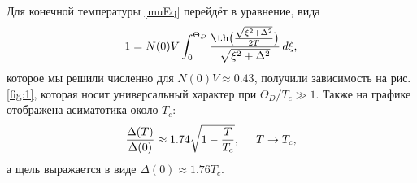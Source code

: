 Для конечной температуры \eqref{muEq} перейдёт в уравнение, вида
\begin{equation*}
	1 = N(0) V \int_{0}^{\Theta_D} \frac{\th\big(\frac{\sqrt{\xi^2 + \Delta^2}}{2 T}\big)}{\sqrt{\xi^2 + \Delta^2}} \d \xi,
\end{equation*}
которое мы решили численно для $N(0) V \approx 0.43$, получили  зависимость на рис. \ref{fig:1}, которая носит универсальный характер при $\Theta_D/T_c \gg 1$. Также на графике отображена асиматотика около $T_c$:
\begin{equation*}
	\frac{\Delta(T)}{\Delta(0)} \approx 1.74 \sqrt{1 - \frac{T}{T_c}},
	\hspace{5 mm} 
	T \to T_c,
\end{equation*}
а щель выражается в виде $\Delta(0) \approx 1.76 T_c$. 